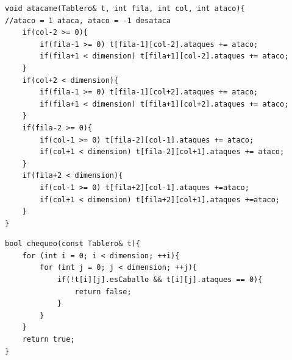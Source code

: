 	\begin{codesnippet}
	\begin{verbatim}
void atacame(Tablero& t, int fila, int col, int ataco){
//ataco = 1 ataca, ataco = -1 desataca
    if(col-2 >= 0){
        if(fila-1 >= 0) t[fila-1][col-2].ataques += ataco;
        if(fila+1 < dimension) t[fila+1][col-2].ataques += ataco;
    }
    if(col+2 < dimension){
        if(fila-1 >= 0) t[fila-1][col+2].ataques += ataco;
        if(fila+1 < dimension) t[fila+1][col+2].ataques += ataco;
    }
    if(fila-2 >= 0){
        if(col-1 >= 0) t[fila-2][col-1].ataques += ataco;
        if(col+1 < dimension) t[fila-2][col+1].ataques += ataco;
    }
    if(fila+2 < dimension){
        if(col-1 >= 0) t[fila+2][col-1].ataques +=ataco;
        if(col+1 < dimension) t[fila+2][col+1].ataques +=ataco;
    }
}
	\end{verbatim}
	\end{codesnippet}

	\begin{codesnippet}
	\begin{verbatim}
bool chequeo(const Tablero& t){
    for (int i = 0; i < dimension; ++i){
        for (int j = 0; j < dimension; ++j){
            if(!t[i][j].esCaballo && t[i][j].ataques == 0){
                return false;
            }
        }
    }
    return true;
}
	\end{verbatim}
	\end{codesnippet}

